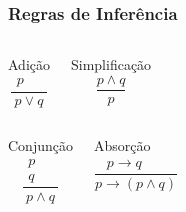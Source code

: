 \documentclass[aspectratio=169]{beamer} %
\begin{document}
\begin{frame}
\frametitle{Regras de Inferência}

\begin{columns}[c]
	\large
	\begin{block}{Adição}
	   \begin{equation*}
	   	\frac{\begin{array}{ll}p  & ~~ \end{array}}{p \vee q}
	   \end{equation*}
 	\end{block}
	
\begin{block}{Simplificação}
	\large
	\begin{equation*}
	\frac{p \wedge q}{p}
	\end{equation*}	
\end{block}

\end{columns}\vfill

\begin{columns}[c]
	\large
	\begin{block}{Conjunção}
		\begin{equation*}
	\frac{\begin{array}{ll} p & ~~ \\ q & ~~\end{array}}{p \wedge q}
		\end{equation*}
	\end{block}
	
\begin{block}{Absorção}
	\large
	\begin{equation*}
	\frac{\begin{array}{ll}p \rightarrow q & ~~~~\end{array}}{p \rightarrow (p \wedge q)}
	\end{equation*}
\end{block}	
	
\end{columns}

\end{frame}
\end{document}
